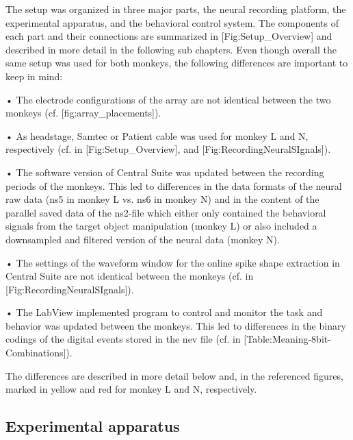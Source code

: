 {The setup was organized in three major parts, the neural recording platform, the experimental apparatus, and the behavioral control system. The components of each part and their connections are summarized in [Fig:Setup\_Overview] and described in more detail in the following sub chapters. Even though overall the same setup was used for both monkeys, the following differences are important to keep in mind: 

• The electrode configurations of the array are not identical between the two monkeys (cf. [fig:array\_placements]).

• As headstage, Samtec or Patient cable was used for monkey L and N, respectively (cf. in [Fig:Setup\_Overview], and [Fig:RecordingNeuralSIgnals]).

• The software version of Central Suite was updated between the recording periods of the monkeys. This led to differences in the data formats of the neural raw data (ns5 in monkey L vs. ns6 in monkey N) and in the content of the parallel saved data of the ns2-file which either only contained the behavioral signals from the target object manipulation (monkey L) or also included a downsampled and filtered version of the neural data (monkey N).

• The settings of the waveform window for the online spike shape extraction in Central Suite are not identical between the monkeys (cf. in [Fig:RecordingNeuralSIgnals]).

• The LabView implemented program to control and monitor the task and behavior was updated between the monkeys. This led to differences in the binary codings of the digital events stored in the nev file (cf. in [Table:Meaning-8bit-Combinations]).

The differences are described in more detail below and, in the referenced figures, marked in yellow and red for monkey L and N, respectively. 



\subsection{Experimental apparatus}

}
